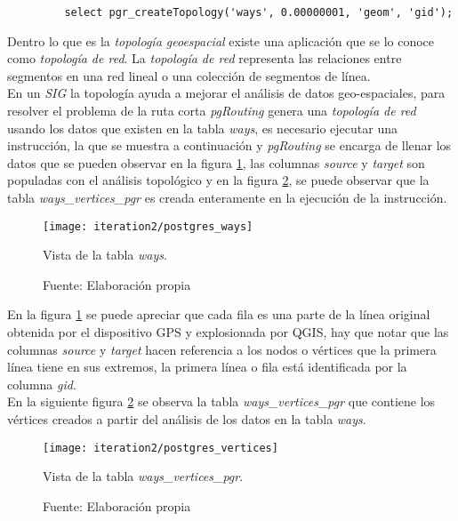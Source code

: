        \begin{verbatim}
         select pgr_createTopology('ways', 0.00000001, 'geom', 'gid');
       \end{verbatim}

       Dentro lo que es la \emph{topología geoespacial} existe una aplicación que se lo conoce como \emph{topología de red}. La \emph{topología de red} representa las relaciones entre segmentos en una red lineal o una colección de segmentos de línea. \cite{osgeo_journal_topology} \\

       En un \emph{SIG} la topología ayuda a mejorar el análisis de datos geo-espaciales, para resolver el problema de la ruta corta \emph{pgRouting} genera una \emph{topología de red} usando los datos que existen en la tabla \emph{ways}, es necesario ejecutar una instrucción, la que se muestra a continuación y \emph{pgRouting} se encarga de llenar los datos que se pueden observar en la figura \ref{fig:postgres_ways}, las columnas \emph{source} y \emph{target} son populadas con el análisis topológico y en la figura \ref{fig:postgres_vertices}, se puede observar que la tabla \emph{ways\_vertices\_pgr} es creada enteramente en la ejecución de la instrucción.\\

       \begin{figure}[H]
         \begin{center}
           \texttt{[image: iteration2/postgres\_ways]}
           \caption{Vista de la tabla \emph{ways}.}
           \label{fig:postgres_ways}
           \caption*{Fuente: Elaboración propia}
         \end{center}
       \end{figure}

       En la figura \ref{fig:postgres_ways} se puede apreciar que cada fila es una parte de la línea original obtenida por el dispositivo GPS y explosionada por QGIS, hay que notar que las columnas \emph{source} y \emph{target} hacen referencia a los nodos o vértices que la primera línea tiene en sus extremos, la primera línea o fila está identificada por la columna \emph{gid}.\\

       En la siguiente figura \ref{fig:postgres_vertices} se observa la tabla \emph{ways\_vertices\_pgr} que contiene los vértices creados a partir del análisis de los datos en la tabla \emph{ways}.

       \begin{figure}[H]
         \begin{center}
           \texttt{[image: iteration2/postgres\_vertices]}
           \caption{Vista de la tabla \emph{ways\_vertices\_pgr}.}
           \label{fig:postgres_vertices}
           \caption*{Fuente: Elaboración propia}
         \end{center}
       \end{figure}

